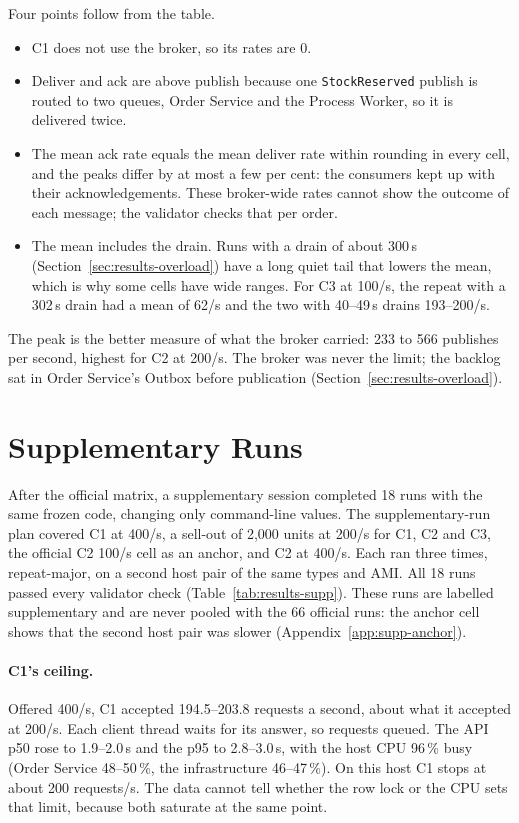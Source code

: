 \documentclass[a4paper]{report}
\begin{document}
Four points follow from the table.
\begin{itemize}
  \item C1 does not use the broker, so its rates are 0.
  \item Deliver and ack are above publish because one \texttt{StockReserved}
    publish is routed to two queues, Order Service and the Process Worker, so
    it is delivered twice.
  \item The mean ack rate equals the mean deliver rate within rounding in
    every cell, and the peaks differ by at most a few per cent: the consumers
    kept up with their acknowledgements. These broker-wide rates cannot show
    the outcome of each message; the validator checks that per order.
  \item The mean includes the drain. Runs with a drain of about 300\,s
    (Section~\ref{sec:results-overload}) have a long quiet tail
    that lowers the mean, which is why some cells have wide ranges. For C3 at
    100/s, the repeat with a 302\,s drain had a mean of 62/s and the two with
    40--49\,s drains 193--200/s.
\end{itemize}
The peak is the better measure of what the broker carried: 233 to 566 publishes
per second, highest for C2 at 200/s. The broker was never the limit; the
backlog sat in Order Service's Outbox before publication
(Section~\ref{sec:results-overload}).

\section{Supplementary Runs}
\label{sec:results-supp}

After the official matrix, a supplementary session completed 18 runs with the
same frozen code, changing only command-line values. The supplementary-run
plan covered C1 at 400/s, a sell-out of 2,000 units at 200/s for C1, C2 and
C3, the official C2 100/s cell as an anchor, and C2 at 400/s. Each ran three
times, repeat-major, on a second host pair of the same types and AMI. All 18 runs passed every validator check
(Table~\ref{tab:results-supp}). These runs are labelled supplementary and are
never pooled with the 66 official runs: the anchor cell shows that the second
host pair was slower (Appendix~\ref{app:supp-anchor}).

\paragraph{C1's ceiling.} Offered 400/s, C1 accepted 194.5--203.8 requests a
second, about what it accepted at 200/s. Each client thread waits for its
answer, so requests queued. The API p50 rose to 1.9--2.0\,s and the p95 to
2.8--3.0\,s, with the host CPU 96\,\% busy (Order Service 48--50\,\%, the
infrastructure 46--47\,\%). On this host C1 stops at about 200 requests/s. The
data cannot tell whether the row lock or the CPU sets that limit, because both
saturate at the same point.
\end{document}

